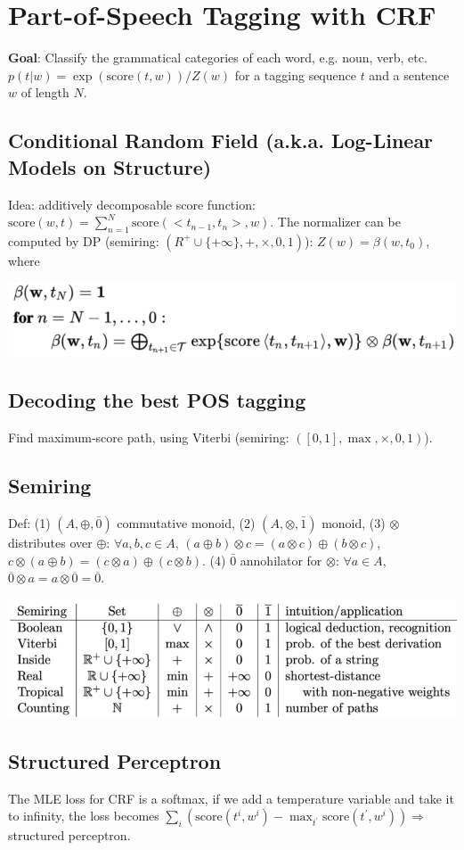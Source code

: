 \section{Part-of-Speech Tagging with CRF}

\textbf{Goal}: Classify the grammatical categories of each word, e.g. noun, verb, etc.
$p(t | w) = \exp(\text{score}(t,w))/{Z(w)}$ for a tagging sequence $t$ and a sentence $w$ of length $N$.

\subsection*{Conditional Random Field (a.k.a. Log-Linear Models on Structure)}

Idea: additively decomposable score function: $\text{score}(w,t) = \sum_{n=1}^{N} \text{score}(<t_{n-1}, t_n>, w)$.
The normalizer can be computed by DP (semiring: $(R^+ \cup \{+\infty\}, +, \times, 0, 1)$): $Z(w) = \beta(w, t_0)$, where
\vspace{-0.3cm}
\begin{center}
    \includegraphics[width=.23\textwidth]{img/CRF-normalizer.png}
\end{center}
\vspace{-0.5cm}

\subsection*{Decoding the best POS tagging}

Find maximum-score path, using Viterbi (semiring: $([0,1], \max, \times, 0, 1)$).

\subsection*{Semiring}

Def: (1) $(A, \oplus, \bar{0})$ commutative monoid, (2) $(A, \otimes, \bar{1})$ monoid, (3) $\otimes$ distributes over $\oplus$: $\forall a,b,c\in A$, $(a \oplus b) \otimes c=(a \otimes c) \oplus(b \otimes c)$,$c \otimes(a \oplus b)=(c \otimes a) \oplus(c \otimes b)$. (4) $\bar{0}$ annohilator for $\otimes$: $\forall a \in A$, $\overline{0} \otimes a=a \otimes \overline{0}=\overline{0}$.

\vspace{-0.5cm}
\begin{center}
    \includegraphics[width=\columnwidth]{img/semiring.png}
\end{center}
\vspace{-0.5cm}
\subsection*{Structured Perceptron}

The MLE loss for CRF is a softmax, if we add a temperature variable and take it to infinity, the loss becomes $\sum_i (\text{score}(t^i, w^i) - \max_{t^\prime} \text{score}(t^\prime, w^i))\Rightarrow$ structured perceptron.
